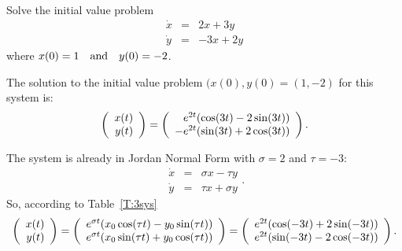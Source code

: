 \documentclass{ximera}
\begin{document}
\begin{exercise} \label{c6.3.1}
Solve the initial value problem
\[
\begin{array}{rcr}
\dot{x} & = & 2x + 3y \\
\dot{y} & = & -3x + 2y
\end{array}
\]
where $x(0) = 1  \quad\mbox{and}\quad  y(0) = -2$.

\begin{solution}

\ans The solution to the initial value problem $(x(0),y(0) = (1,-2)$ for
this system is:
\[
\left(\begin{array}{r} x(t) \\ y(t)\end{array}\right) = \left(\begin{array}{r} e^{2t}(\cos(3t) - 2\sin(3t)) \\ -e^{2t}(\sin(3t) + 2\cos(3t))\end{array}\right).
\]

\soln The system is already in Jordan Normal Form with $\sigma = 2$ and $\tau = -3$: 
\[
\begin{array}{rrr}
\dot{x} & = & \sigma x - \tau y \\
\dot{y} & = & \tau x + \sigma y \end{array}. 
\]
So, according to Table~\ref{T:3sys}
\[
\left(\begin{array}{r} x(t) \\ y(t)\end{array}\right) = \left(\begin{array}{r} e^{\sigma t}(x_0\cos(\tau t) -
y_0\sin(\tau t)) \\ e^{\sigma t}(x_0\sin(\tau t) +
y_0\cos(\tau t))\end{array}\right) = \left(\begin{array}{r} e^{2t}(\cos(-3t) + 2\sin(-3t)) \\ e^{2t}(\sin(-3t) -2\cos(-3t))\end{array}\right).
\]

\end{solution}
\end{exercise}
\end{document}
